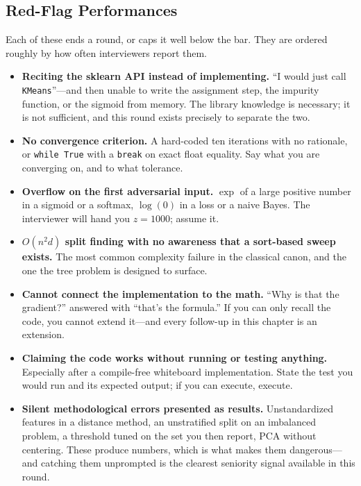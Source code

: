 \subsection{Red-Flag Performances}

Each of these ends a round, or caps it well below the bar. They are ordered roughly by how often interviewers report them.

\begin{itemize}
    \item \textbf{Reciting the sklearn API instead of implementing.} ``I would just call \texttt{KMeans}''---and then unable to write the assignment step, the impurity function, or the sigmoid from memory. The library knowledge is necessary; it is not sufficient, and this round exists precisely to separate the two.
    \item \textbf{No convergence criterion.} A hard-coded ten iterations with no rationale, or \texttt{while True} with a \texttt{break} on exact float equality. Say what you are converging on, and to what tolerance.
    \item \textbf{Overflow on the first adversarial input.} $\exp$ of a large positive number in a sigmoid or a softmax, $\log(0)$ in a loss or a naive Bayes. The interviewer will hand you $z = 1000$; assume it.
    \item \textbf{$O(n^2 d)$ split finding with no awareness that a sort-based sweep exists.} The most common complexity failure in the classical canon, and the one the tree problem is designed to surface.
    \item \textbf{Cannot connect the implementation to the math.} ``Why is that the gradient?'' answered with ``that's the formula.'' If you can only recall the code, you cannot extend it---and every follow-up in this chapter is an extension.
    \item \textbf{Claiming the code works without running or testing anything.} Especially after a compile-free whiteboard implementation. State the test you would run and its expected output; if you can execute, execute.
    \item \textbf{Silent methodological errors presented as results.} Unstandardized features in a distance method, an unstratified split on an imbalanced problem, a threshold tuned on the set you then report, PCA without centering. These produce numbers, which is what makes them dangerous---and catching them unprompted is the clearest seniority signal available in this round.
\end{itemize}

